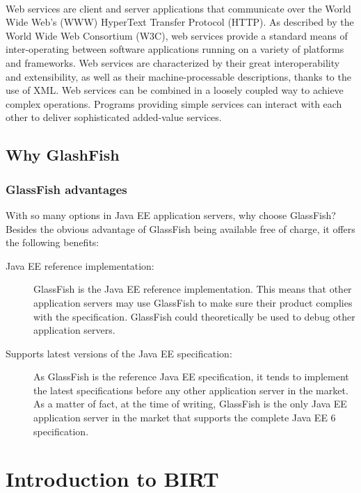 \paragraph{}
Web services are client and server applications that communicate over the World Wide Web’s (WWW) HyperText Transfer Protocol (HTTP). As described by the World Wide Web Consortium (W3C), web services provide a standard means of inter-operating between software applications running on a variety of platforms and frameworks. Web services are characterized by their great interoperability and extensibility, as well as their machine-processable descriptions, thanks to the use of XML. Web services can be combined in a loosely coupled way to achieve complex operations. Programs providing simple services can interact with each other to deliver sophisticated added-value services.

\subsection{Why GlashFish}
\subsubsection{GlassFish advantages}
With so many options in Java EE application servers, why choose GlassFish? Besides the obvious advantage of GlassFish being available free of charge, it offers the following benefits:

\begin{description}
\item[Java EE reference implementation:] GlassFish is the Java EE reference implementation. This means that other application servers may use GlassFish to make sure their product complies with the specification. GlassFish could theoretically be used to debug other application servers.

\item[Supports latest versions of the Java EE specification:] As GlassFish is the reference Java EE specification, it tends to implement the latest specifications before any other application server in the market. As a matter of fact, at the time of writing, GlassFish is the only Java EE application server in the market that supports the complete Java EE 6 specification.
\end{description}

\section{Introduction to BIRT}
